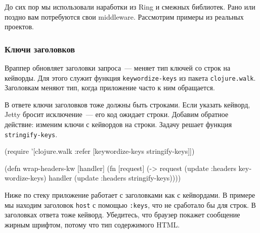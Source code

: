 
До сих пор мы использовали наработки из Ring и смежных библиотек. Рано или
поздно вам потребуются свои middleware. Рассмотрим примеры из реальных проектов.

\subsubsection*{Ключи заголовков}


Враппер обновляет заголовки запроса~--- меняет тип ключей со строк на
кейворды. Для этого служит функция \verb|keywordize-keys| из пакета
\verb|clojure.walk|. Заголовкам меняют тип, когда приложение часто к ним
обращается.


В ответе ключи заголовков тоже должны быть строками. Если указать кейворд, Jetty
бросит исключение~--- его код ожидает строки. Добавим обратное действие: изменим
ключи с кейвордов на строки. Задачу решает функция \verb|stringify-keys|.


\begin{english}
  \begin{clojure}
(require '[clojure.walk :refer
           [keywordize-keys stringify-keys]])

(defn wrap-headers-kw [handler]
  (fn [request]
    (-> request
        (update :headers keywordize-keys)
        handler
        (update :headers stringify-keys))))
  \end{clojure}
\end{english}

Ниже по стеку приложение работает с заголовками как с кейвордами. В примере мы
находим заголовок \verb|host| с помощью \verb|:keys|, что не сработало бы
для строк. В заголовках ответа тоже кейворд. Убедитесь, что браузер покажет
сообщение жирным шрифтом, потому что тип содержимого HTML.

\begin{english}
\end{english}

